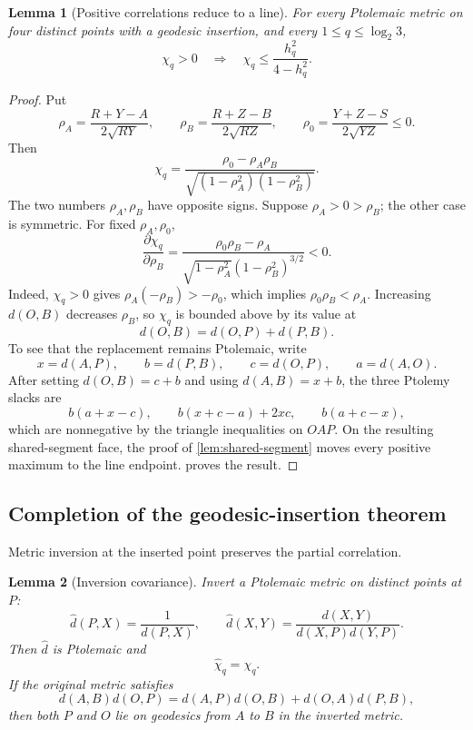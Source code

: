 \documentclass[11pt]{amsart}
\newtheorem{lemma}[lemma]{Lemma}
\theoremstyle{definition}
\theoremstyle{remark}
\begin{document}
\begin{lemma}[Positive correlations reduce to a line]\label{lem:positive-to-line}
For every Ptolemaic metric on four distinct points with a geodesic
insertion, and every
\(1\leq q\leq\log_2 3\),
\[
 \chi_q>0
 \quad\Longrightarrow\quad
 \chi_q\leq\frac{h_q^2}{4-h_q^2}.
\]
\end{lemma}

\begin{proof}
Put
\[
 \rho_A=\frac{R+Y-A}{2\sqrt{RY}},
 \qquad
 \rho_B=\frac{R+Z-B}{2\sqrt{RZ}},
 \qquad
 \rho_0=\frac{Y+Z-S}{2\sqrt{YZ}}\leq0.
\]
Then
\[
 \chi_q=
 \frac{\rho_0-\rho_A\rho_B}
 {\sqrt{(1-\rho_A^2)(1-\rho_B^2)}}.
\]
The two numbers \(\rho_A,\rho_B\) have opposite signs. Suppose
\(\rho_A>0>\rho_B\); the other case is symmetric. For fixed
\(\rho_A,\rho_0\),
\[
 \frac{\partial\chi_q}{\partial\rho_B}
 =\frac{\rho_0\rho_B-\rho_A}
 {\sqrt{1-\rho_A^2}(1-\rho_B^2)^{3/2}}<0.
\]
Indeed, \(\chi_q>0\) gives
\(\rho_A(-\rho_B)>-\rho_0\), which implies
\(\rho_0\rho_B<\rho_A\). Increasing \(d(O,B)\) decreases
\(\rho_B\), so \(\chi_q\) is bounded above by its value at
\[
 d(O,B)=d(O,P)+d(P,B).
\]
To see that the replacement remains Ptolemaic, write
\[
 x=d(A,P),\qquad b=d(P,B),\qquad c=d(O,P),\qquad a=d(A,O).
\]
After setting \(d(O,B)=c+b\) and using \(d(A,B)=x+b\), the three Ptolemy slacks are
\[
 b(a+x-c),\qquad b(x+c-a)+2xc,\qquad b(a+c-x),
\]
which are nonnegative by the triangle inequalities on \(OAP\). On the resulting shared-segment face, the proof of \cref{lem:shared-segment} moves every positive maximum to the line endpoint.  proves the result.
\end{proof}

\subsection{Completion of the geodesic-insertion theorem}

Metric inversion at the inserted point preserves the partial correlation.

\begin{lemma}[Inversion covariance]\label{lem:inversion}
Invert a Ptolemaic metric on distinct points at \(P\):
\[
 \widehat d(P,X)=\frac1{d(P,X)},
 \qquad
 \widehat d(X,Y)=
 \frac{d(X,Y)}{d(X,P)d(Y,P)}.
\]
Then \(\widehat d\) is Ptolemaic and
\[
 \widehat\chi_q=\chi_q.
\]
If the original metric satisfies
\[
 d(A,B)d(O,P)
 =d(A,P)d(O,B)+d(O,A)d(P,B),
\]
then both \(P\) and \(O\) lie on geodesics from \(A\) to \(B\) in the inverted metric.
\end{lemma}
\end{document}
